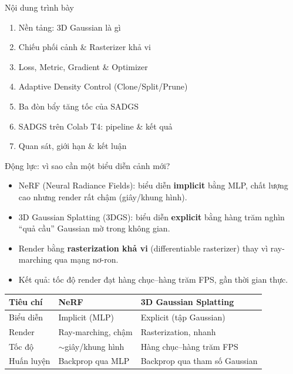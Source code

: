 \begin{frame}
\titlepage
\end{frame}

\begin{frame}{Nội dung trình bày}
\begin{enumerate}
    \item Nền tảng: 3D Gaussian là gì
    \item Chiếu phối cảnh \& Rasterizer khả vi
    \item Loss, Metric, Gradient \& Optimizer
    \item Adaptive Density Control (Clone/Split/Prune)
    \item Ba đòn bẩy tăng tốc của SADGS
    \item SADGS trên Colab T4: pipeline \& kết quả
    \item Quan sát, giới hạn \& kết luận
\end{enumerate}
\end{frame}

\begin{frame}{Động lực: vì sao cần một biểu diễn cảnh mới?}
\begin{itemize}
    \item NeRF (Neural Radiance Fields): biểu diễn \textbf{implicit} bằng MLP, chất lượng cao nhưng render rất chậm (giây/khung hình).
    \item 3D Gaussian Splatting (3DGS): biểu diễn \textbf{explicit} bằng hàng trăm nghìn ``quả cầu'' Gaussian mờ trong không gian.
    \item Render bằng \textbf{rasterization khả vi} (differentiable rasterizer) thay vì ray-marching qua mạng nơ-ron.
    \item Kết quả: tốc độ render đạt hàng chục--hàng trăm FPS, gần thời gian thực.
\end{itemize}
\vspace{0.3cm}
\small
\centering
\begin{tabular}{lll}
\toprule
\textbf{Tiêu chí} & \textbf{NeRF} & \textbf{3D Gaussian Splatting} \\
\midrule
Biểu diễn & Implicit (MLP) & Explicit (tập Gaussian) \\
Render & Ray-marching, chậm & Rasterization, nhanh \\
Tốc độ & $\sim$giây/khung hình & Hàng chục--hàng trăm FPS \\
Huấn luyện & Backprop qua MLP & Backprop qua tham số Gaussian \\
\bottomrule
\end{tabular}
\end{frame}


